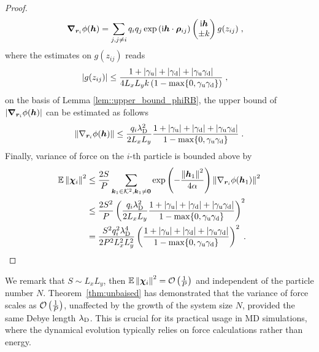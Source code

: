 \begin{proof}
\begin{align*}
  \boldsymbol{\nabla}_{\boldsymbol{r}_i} \phi(\boldsymbol{h})  &=\sum_{j,j\neq i}q_iq_j  \exp{(\mathrm{i} \boldsymbol{h} \cdot \boldsymbol{\rho}_{ij})} \begin{pmatrix} \mathrm{i} \boldsymbol{h} \\
 \pm k  \end{pmatrix}g(z_{ij})\;,
\end{align*}
where the estimates on $g(z_{ij})$ reads
\begin{align*}
  \left\lvert g(z_{ij})  \right\rvert&\leq  \frac{1+\left\lvert\gamma_{\mathrm{u}}\right\rvert+\left\lvert\gamma_{\mathrm{d}}\right\rvert+\left\lvert\gamma_{\mathrm{u}}\gamma_{\mathrm{d}}\right\rvert}{4  L_xL_y k\left(1-\max\{0,\gamma_{\mathrm{u}}\gamma_{\mathrm{d}}\}\right)}\;,
\end{align*}
on the basis of Lemma \ref{lem::upper_bound_phiRB}, the upper bound of~$\lvert\boldsymbol{\nabla}_{\boldsymbol{r}_i} \phi(\boldsymbol{h})\rvert$ can be estimated as follows 
\begin{equation}
  \left\lVert\nabla_{\bm{r}_i}\phi(\boldsymbol{h})\right\rVert\leq \frac{q_i\lambda_{\mathrm{D}}^2}{2  L_xL_y}    \frac{1+\left\lvert\gamma_{\mathrm{u}}\right\rvert+\left\lvert\gamma_{\mathrm{d}}\right\rvert+\left\lvert\gamma_{\mathrm{u}}\gamma_{\mathrm{d}}\right\rvert}{1-\max\{0,\gamma_{\mathrm{u}}\gamma_{\mathrm{d}}\}}\;.
\end{equation}
Finally,  variance of force on the $i$-th particle is bounded above by
\begin{align*}
   	\mathbb{E}\left\lVert\boldsymbol{\chi}_{i}\right\rVert^2&\leq   \frac{2S}{P}\sum_{\bm{k}_1\in\mathcal{K}^2, \bm{k}_1\neq \bm{0}}\exp\left(-\frac{\left\lVert\boldsymbol{h}_1\right\rVert^2}{4\alpha}\right)\left\lVert\nabla_{\bm{r}_i}\phi(\boldsymbol{h}_1)\right\rVert^2\\
    &\leq  \frac{2S^2}{P}\left(\frac{q_i\lambda_{\mathrm{D}}^2}{2  L_xL_y}    \frac{1+\left\lvert\gamma_{\mathrm{u}}\right\rvert+\left\lvert\gamma_{\mathrm{d}}\right\rvert+\left\lvert\gamma_{\mathrm{u}}\gamma_{\mathrm{d}}\right\rvert}{1-\max\{0,\gamma_{\mathrm{u}}\gamma_{\mathrm{d}}\}}\right)^2\\
    &= \frac{ S^2q_i^2\lambda_{\mathrm{D}}^4}{2P ^2 L_x^2L_y^2}\left( \frac{1+\left\lvert\gamma_{\mathrm{u}}\right\rvert+\left\lvert\gamma_{\mathrm{d}}\right\rvert+\left\lvert\gamma_{\mathrm{u}}\gamma_{\mathrm{d}}\right\rvert}{1-\max\{0,\gamma_{\mathrm{u}}\gamma_{\mathrm{d}}\}}\right)^2\;.
\end{align*}
\end{proof}
We remark that $S \sim L_xL_y$, then $	\mathbb{E}\left\lVert\boldsymbol{\chi}_{i}\right\rVert^2=\mathcal{O}\left(\frac{1}{P}\right)$ and independent of the particle number $N$.
Theorem~\ref{thm:unbaised} has demonstrated that the variance of force scales as $\mathcal{O}\left(\frac{1}{P}\right)$, unaffected by the growth of the system size $N$, provided the same   Debye length $\lambda_{\mathrm{D}}$. 
This is crucial for its practical usage in MD simulations, where the dynamical evolution typically relies on force calculations rather than energy. 
